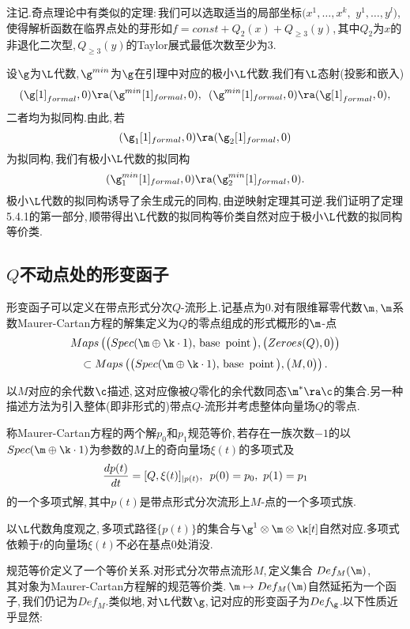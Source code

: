 注记.奇点理论中有类似的定理:\,我们可以选取适当的局部坐标$(x^1,\dots,x^k,$
$y^1,\dots,y^l)$,\,使得解析函数在临界点处的芽形如$f=const+Q_2(x)+Q_{\ge 3}(y)$,\,其中$Q_2$为$x$的非退化二次型,\,$Q_{\ge 3}(y)$的Taylor展式最低次数至少为$3$.

设$\g$为$\L$代数,\,$\g^{min}$为$\g$在引理中对应的极小$\L$代数.我们有$\L$态射(投影和嵌入)
$$(\g[1]_{formal},0)\ra (\g^{min}[1]_{formal},0),\,\,\,
             (\g^{min}
             [1]_{formal},0)\ra (\g[1]_{formal},0),$$
二者均为拟同构.由此,\,若
$$(\g_1[1]_{formal},0)
             \ra (\g_2[1]_{formal},0)$$
为拟同构,\,我们有极小$\L$代数的拟同构
$$(\g_1^{min}
             [1]_{formal},0)\ra (\g_2^{min}[1]_{formal},0).$$
极小$\L$代数的拟同构诱导了余生成元的同构,\,由逆映射定理其可逆.我们证明了定理5.4.1的第一部分,\,顺带得出$\L$代数的拟同构等价类自然对应于极小$\L$代数的拟同构等价类.



\subsection{$Q$不动点处的形变函子}

形变函子可以定义在带点形式分次$Q$-流形上.记基点为$0$.对有限维幂零代数$\m$,\,$\m$系数Maurer-Cartan方程的解集定义为$Q$的零点组成的形式概形的$\m$-点
$$Maps\left(\bigl(
                  Spec(\m\oplus \k\cdot 1), \,{\rm base\,\,\,point}\,\bigr),
                  \bigl(Zeroes(Q),0\bigr)\right)$$$$\subset
                  Maps\left(\bigl(
                  Spec(\m\oplus \k\cdot 1), \,{\rm base\,\,\,point}\,\bigr),
                  \bigl(M,0\bigr)\right).$$

以$M$对应的余代数$\c$描述,\,这对应像被$Q$零化的余代数同态$\m^*\ra \c$的集合.另一种描述方法为引入整体(即非形式的)带点$Q$-流形并考虑整体向量场$Q$的零点.

称Maurer-Cartan方程的两个解$p_0$和$p_1$规范等价,\,若存在一族次数$-1$的以$Spec(\m\oplus\k\cdot 1)$为参数的$M$上的奇向量场$\xi(t)$的多项式及
$${d p(t)\over dt}= [Q,\xi(t)]_{|p(t)},\,\,\,
                    p(0)=p_0,\,\,p(1)=p_1$$
的一个多项式解,\,其中$p(t)$是带点形式分次流形上$M$-点的一个多项式族.

以$\L$代数角度观之,\,多项式路径$\{p(t)\}$的集合与$\g^1\otimes \m\otimes \k[t]$自然对应.多项式依赖于$t$的向量场$\xi(t)$不必在基点$0$处消没.

规范等价定义了一个等价关系.对形式分次带点流形$M$,\,定义集合
$Def_M(\m)$,\,\\其对象为Maurer-Cartan方程解的规范等价类.\,$\m\mapsto Def_M(\m)$自然延拓为一个函子,\,我们仍记为$Def_M$.类似地,\,对$\L$代数$\g$,\,记对应的形变函子为$Def_\g$.以下性质近乎显然:\,

